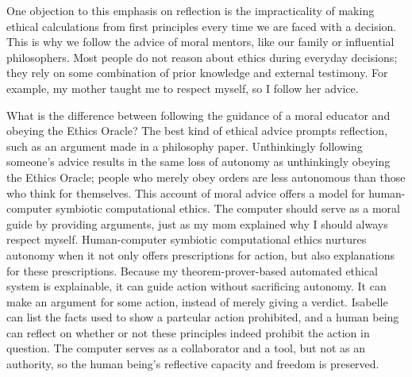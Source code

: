 \begin{isabellebody}
\begin{isamarkuptext}
One objection to this emphasis on reflection is the impracticality of making ethical calculations from first principles 
every time we are faced with a decision. This is why we follow the advice of moral mentors, like our 
family or influential philosophers. 
Most people do not reason about ethics during everyday decisions; they rely on some combination of 
prior knowledge and external testimony. For example, my mother taught me to respect myself, so I 
follow her advice. 

What is the difference between following the guidance of a moral educator and
obeying the Ethics Oracle? The best kind of ethical advice prompts reflection, such as an argument 
made in a philosophy paper. Unthinkingly following someone’s advice results in the same loss of 
autonomy as unthinkingly obeying the Ethics Oracle; people who merely obey orders are less autonomous 
than those who think for themselves. This account of moral advice offers a model for human-computer 
symbiotic computational ethics. The computer should serve as a moral guide by providing arguments, just as my mom 
explained why I should always respect myself. Human-computer symbiotic computational
ethics nurtures autonomy when it not only offers prescriptions for action, but also explanations for 
these prescriptions. Because my theorem-prover-based automated ethical system is explainable, it can 
guide action without sacrificing autonomy. It can make an argument for some action, instead of 
merely giving a verdict. Isabelle can list the facts used to show
a partcular action prohibited, and a human being can reflect on whether or not these principles
indeed prohibit the action in question. The computer serves as a collaborator and a tool, but not as an authority, 
so the human being’s reflective capacity and freedom is preserved. 


\end{isamarkuptext}
\end{isabellebody}
